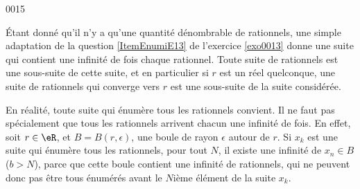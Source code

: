 
\begin{corrige}{0015}

Étant donné qu'il n'y a qu'une quantité dénombrable de rationnels, une simple adaptation de la question \ref{ItemEnumiE13} de l'exercice \ref{exo0013} donne une suite qui contient une infinité de fois chaque rationnel. Toute suite de rationnels est une sous-suite de cette suite, et en particulier si $r$ est un réel quelconque, une suite de rationnels qui converge vers $r$ est une sous-suite de la suite considérée.

\begin{alternative}
En réalité, toute suite qui énumère tous les rationnels convient. Il ne faut pas spécialement que tous les rationnels arrivent chacun une infinité de fois. En effet, soit $r\in\eR$, et $B=B(r,\epsilon)$, une boule de rayon $\epsilon$ autour de $r$. Si $x_k$ est une suite qui énumère tous les rationnels, pour tout $N$, il existe une infinité de $x_n\in B$ ($b>N$), parce que cette boule contient une infinité de rationnels, qui ne peuvent donc pas être tous énumérés avant le $N$ième élément de la suite $x_k$.
\end{alternative}

\end{corrige}
